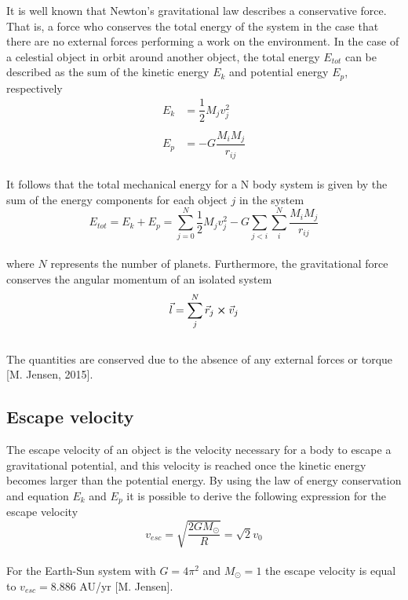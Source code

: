 \documentclass[%
reprint,nofootinbib,
amsmath,amssymb,
aps,
]{revtex4-1}
\begin{document}
It is well known that Newton's gravitational law describes a conservative force. That is, a force who conserves the total energy of the system in the case that there are no external forces performing a work on the environment. In the case of a celestial object in orbit around another object, the total energy $E_{tot}$ can be described as the sum of the kinetic energy $E_k$ and potential energy $E_p$, respectively \vspace{3mm}  \\ 
\begin{align}
	E_k &= \dfrac{1}{2}M_jv_j^2 \label{Ek}\\ 
	& \nonumber \\ 
	E_p &= -G\dfrac{M_iM_j}{r_{ij}} \label{Ep}
\end{align} \vspace{3mm}  \\
It follows that the total mechanical energy for a N body system is given by the sum of the energy components for each object $j$ in the system \vspace{3mm} \\ 
\begin{equation} \label{Et}
	E_{tot} = E_k + E_p =  \sum_{j = 0}^{N} \dfrac{1}{2}M_jv_j^2 - G \sum_{j<i}\sum_{i}^{N} \dfrac{M_iM_j}{r_{ij}}
\end{equation}  \vspace{3mm} \\ 
where $N$ represents the number of planets. Furthermore, the gravitational force conserves the angular momentum of an isolated system  \vspace{3mm} \\ 
\begin{equation}\label{lmomentum}
	\vec{l} = \sum_{j}^{N}\vec{r}_j\cross \vec{v}_j
\end{equation}  \vspace{3mm} \\ 
The quantities are conserved due to the absence of any external forces or torque [M. Jensen, 2015]. 

\subsection{Escape velocity} \noindent 
The escape velocity of an object is the velocity necessary for a body to escape a gravitational potential, and this velocity is reached once the kinetic energy becomes larger than the potential energy. By using the law of energy conservation and equation $E_k$ and $E_p$ it is possible to derive the following expression for the escape velocity  \vspace{3mm} \\
\begin{equation}\label{vesc}
v_{esc} = \sqrt{\dfrac{2GM_\odot}{R}} = \sqrt{2}v_0
\end{equation} \vspace{3mm} \\
For the Earth-Sun system with $G = 4\pi^2$ and $M_\odot = 1$ the escape velocity is equal to $v_{esc} = 8.886$ AU/yr [M. Jensen].
\end{document}
